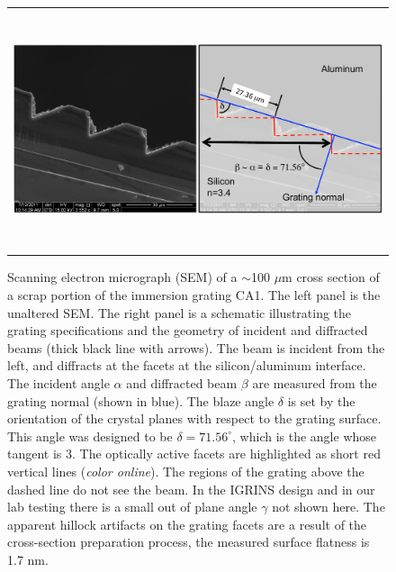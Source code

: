    \begin{figure}
   \begin{center}
   \begin{tabular}{c}
   \includegraphics[height=7cm]{chSPIE_2012_CA1/figs/CA1_SEM_cross3}
   \end{tabular}
   \end{center}
   \caption[CA1a SEM]{ \label{fig:CA1aSEM}  Scanning electron micrograph (SEM) of a $\sim$100 $\mu$m cross section of a scrap portion of the immersion grating CA1.  The left panel is the unaltered SEM.  The right panel is a schematic illustrating the grating specifications and the geometry of incident and diffracted beams (thick black line with arrows).  The beam is incident from the left, and diffracts at the facets at the silicon/aluminum interface.  The incident angle $\alpha$ and diffracted beam $\beta$ are measured from the grating normal (shown in blue).  The blaze angle $\delta$ is set by the orientation of the crystal planes with respect to the grating surface.  This angle was designed to be $\delta=71.56^\circ$, which is the angle whose tangent is 3.  The optically active facets are highlighted as short red vertical lines (\emph{color online}).  The regions of the grating above the dashed line do not see the beam.  In the IGRINS design and in our lab testing there is a small out of plane angle $\gamma$ not shown here.  The apparent hillock artifacts on the grating facets are a result of the cross-section preparation process, the measured\cite{wang2010} surface flatness is 1.7 nm.}
   \end{figure} 

